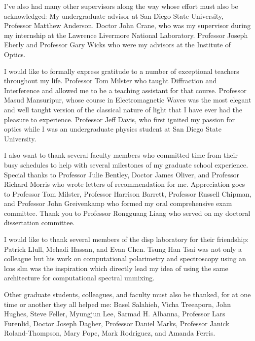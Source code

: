I've also had many other supervisors along the way whose effort must also be acknowledged: My undergraduate advisor at San Diego State University, Professor Matthew Anderson. Doctor John Crane, who was my supervisor during my internship at the Lawrence Livermore National Laboratory. Professor Joseph Eberly and Professor Gary Wicks who were my advisors at the Institute of Optics. 

I would like to formally express gratitude to a number of exceptional teachers throughout my life. Professor Tom Milster who taught Diffraction and Interference and allowed me to be a teaching assistant for that course. Professor Masud Mansuripur, whose course in Electromagnetic Waves was the most elegant and well taught version of the classical nature of light that I have ever had the pleasure to experience. Professor Jeff Davis, who first ignited my passion for optics while I was an undergraduate physics student at San Diego State University.

I also want to thank several faculty members who committed time from their busy schedules to help with several milestones of my graduate school experience. Special thanks to Professor Julie Bentley, Doctor James Oliver, and Professor Richard Morris who wrote letters of recommendation for me. Appreciation goes to Professor Tom Milster, Professor Harrison Barrett, Professor Russell Chipman, and Professor John Greivenkamp who formed my oral comprehensive exam committee. Thank you to Professor Rongguang Liang who served on my doctoral dissertation committee.

I would like to thank several members of the \gls{disp} laboratory for their friendship: Patrick Llull, Mehadi Hassan, and Evan Chen. Tsung Han Tsai was not only a colleague but his work on computational polarimetry and spectroscopy using an \gls{lcos} \gls{slm} was the inspiration which directly lead my idea of using the same architecture for computational spectral unmixing. 

Other graduate students, colleagues, and faculty must also be thanked, for at one time or another they all helped me: Basel Salahieh, Vicha Treeaporn, John Hughes, Steve Feller, Myungjun Lee, Sarmad H. Albanna, Professor Lars Furenlid, Doctor Joseph Dagher, Professor Daniel Marks, Professor Janick Roland-Thompson, Mary Pope, Mark Rodriguez, and Amanda Ferris. 

